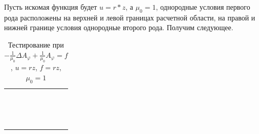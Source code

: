 Пусть искомая функция будет $u = r * z$, а  $\mu_0 = 1$, однородные условия первого рода расположены на верхней и левой границах расчетной области, на правой и нижней границе условия однородные второго рода. Получим следующее. 

\begin{table}
	\caption{Тестирование при $-\frac{1}{\mu_0} \Delta A_{\varphi} + \frac{1}{\mu_0} A_{\varphi} = f$, $u = rz$, $f = rz$, $\mu_0 = 1$}
	\centering
	\small
	\begin{tabularx}{1.0\textwidth}{| >{\raggedright\arraybackslash}X | >{\raggedright\arraybackslash}X | >{\raggedright\arraybackslash}X |>{\raggedright\arraybackslash}X |}
		\hline
		\centering{Узел} & \centering{Значение} & \centering{Абсолютная погрешность} & \centering{Относительная погрешность} \tabularnewline \hline
		
		

		\centering{(20,0008; -20)} & \centering{-3.99991668E+002}& \centering{2.43321134E-002} & \centering{6.08278503E-005} \tabularnewline \hline
		\centering{(40,0006; -20)} & \centering{-8.00041536E+002} & \centering{2.95364092E-002} & \centering{3.69199577E-005} \tabularnewline \hline
 		 \centering{(60,0004; -20)} & \centering{-1.19973146E+003} & \centering{2.76538286E-001} & \centering{2.30447035E-004} \tabularnewline \hline
		\centering{(80,0002; -20)} & \centering{-1.60083585E+003} & \centering{8.31847171E-001} & \centering{5.19903182E-004} \tabularnewline \hline
		\centering{(100; -20)} & \centering{-1.99651310E+003} & \centering{3.48690361E+000} & \centering{1.74345181E-003} \tabularnewline \hline


		\centering{(20,0008; -40)} & \centering{-8.00073346E+002}& \centering{4.13461873E-002} & \centering{5.16806669E-005} \tabularnewline \hline
		\centering{(40,0006; -40)} & \centering{-1.60026312E+003} & \centering{2.39123420E-001} & \centering{1.49449896E-004} \tabularnewline \hline
 		\centering{(60,0004; -40)} & \centering{-2.39973286E+003} & \centering{2.83136319E-001} & \centering{1.17972680E-004} \tabularnewline \hline
		\centering{(80,0002; -40)} & \centering{-3.20203212E+003} & \centering{2.02411646E+000} & \centering{6.32534811E-004} \tabularnewline \hline
		\centering{(100; -40)} & \centering{-3.99347480E+003} & \centering{6.52519957E+000} & \centering{1.63129989E-003} \tabularnewline \hline

		\centering{(20,0008; -60)} & \centering{-1.19978676E+003}& \centering{2.61241225E-001} & \centering{2.17692313E-004} \tabularnewline \hline
		\centering{(40,0006; -60)} & \centering{-2.39974806E+003} & \centering{2.87944345E-001} & \centering{1.19975011E-004} \tabularnewline \hline
		\centering{(60,0004; -60)} & \centering{-3.59862984E+003} & \centering{1.39415571E+000} & \centering{3.87262893E-004} \tabularnewline \hline
		\centering{(80,0002; -60)} & \centering{-4.80175375E+003} & \centering{1.74174814E+000} & \centering{3.62863288E-004} \tabularnewline \hline
		\centering{(100; -60)} & \centering{-5.98860115E+003} & \centering{1.13988464E+001} & \centering{1.89980774E-003} \tabularnewline \hline
		 		

\end{tabularx}
\end{table}
